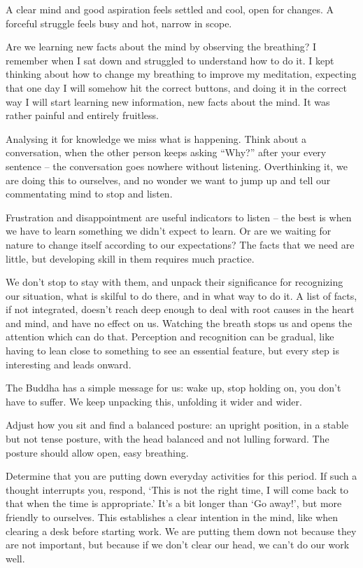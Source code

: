 A clear mind and good aspiration feels settled and cool, open for
changes. A forceful struggle feels busy and hot, narrow in scope.

Are we learning new facts about the mind by observing the breathing? I
remember when I sat down and struggled to understand how to do it. I
kept thinking about how to change my breathing to improve my meditation,
expecting that one day I will somehow hit the correct buttons, and doing
it in the correct way I will start learning new information, new facts
about the mind. It was rather painful and entirely fruitless.

Analysing it for knowledge we miss what is happening. Think about a
conversation, when the other person keeps asking ``Why?'' after your
every sentence -- the conversation goes nowhere without listening.
Overthinking it, we are doing this to ourselves, and no wonder we want
to jump up and tell our commentating mind to stop and listen.

Frustration and disappointment are useful indicators to listen -- the
best is when we have to learn something we didn't expect to learn. Or
are we waiting for nature to change itself according to our
expectations? The facts that we need are little, but developing skill in
them requires much practice.

We don't stop to stay with them, and unpack their significance for
recognizing our situation, what is skilful to do there, and in what way
to do it. A list of facts, if not integrated, doesn't reach deep enough
to deal with root causes in the heart and mind, and have no effect on
us. Watching the breath stops us and opens the attention which can do
that. Perception and recognition can be gradual, like having to lean
close to something to see an essential feature, but every step is
interesting and leads onward.

The Buddha has a simple message for us: wake up, stop holding on, you
don't have to suffer. We keep unpacking this, unfolding it wider and
wider.

Adjust how you sit and find a balanced posture: an upright position, in
a stable but not tense posture, with the head balanced and not lulling
forward. The posture should allow open, easy breathing.

Determine that you are putting down everyday activities for this period.
If such a thought interrupts you, respond, `This is not the right time,
I will come back to that when the time is appropriate.' It's a bit
longer than `Go away!', but more friendly to ourselves. This establishes
a clear intention in the mind, like when clearing a desk before starting
work. We are putting them down not because they are not important, but
because if we don't clear our head, we can't do our work well.

